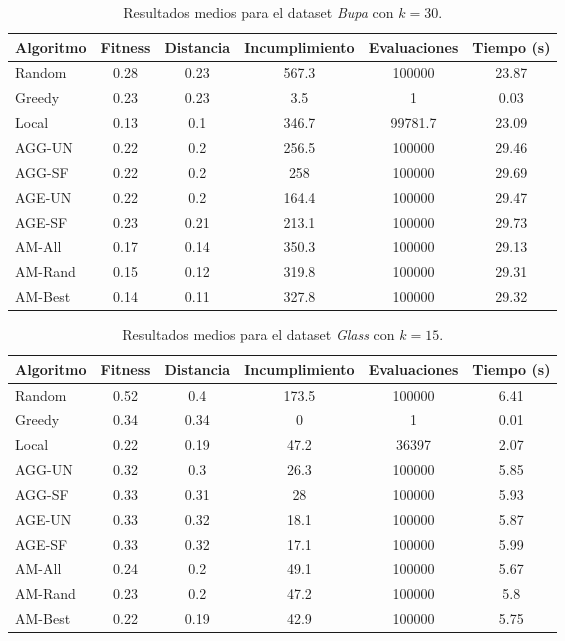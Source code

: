 \documentclass[a4paper,12pt]{article}%
\begin{document}
\begin{table}[H]
	\centering
	\begin{tabular}{|l|ccccc|}
		\hline
		Algoritmo & Fitness & Distancia & Incumplimiento & Evaluaciones & Tiempo (s) \\
		\hline
		Random & 0.28 & 0.23 & 567.3 & 100000 & 23.87 \\
		Greedy & 0.23 & 0.23 & 3.5 & 1 & 0.03 \\
		Local  & 0.13 & 0.1 & 346.7 & 99781.7 & 23.09 \\
		AGG-UN & 0.22 & 0.2 & 256.5 & 100000 & 29.46 \\
		AGG-SF & 0.22 & 0.2 & 258 & 100000 & 29.69 \\
		AGE-UN & 0.22 & 0.2 & 164.4 & 100000 & 29.47 \\
		AGE-SF & 0.23 & 0.21 & 213.1 & 100000 & 29.73 \\
		AM-All & 0.17 & 0.14 & 350.3 & 100000 & 29.13 \\
		AM-Rand & 0.15 & 0.12 & 319.8 & 100000 & 29.31 \\
		AM-Best & 0.14 & 0.11 & 327.8 & 100000 & 29.32 \\
		\hline
	\end{tabular}
	\caption{Resultados medios para el dataset \textit{Bupa} con $k=30$.}
	\label{tab_bupa30}
\end{table}

\begin{table}[H]
	\centering
	\begin{tabular}{|l|ccccc|}
		\hline
		Algoritmo & Fitness & Distancia & Incumplimiento & Evaluaciones & Tiempo (s) \\
		\hline
		Random & 0.52 & 0.4 & 173.5 & 100000 & 6.41 \\
		Greedy & 0.34 & 0.34 & 0 & 1 & 0.01 \\
		Local  & 0.22 & 0.19 & 47.2 & 36397 & 2.07 \\
		AGG-UN & 0.32 & 0.3 & 26.3 & 100000 & 5.85 \\
		AGG-SF & 0.33 & 0.31 & 28 & 100000 & 5.93 \\
		AGE-UN & 0.33 & 0.32 & 18.1 & 100000 & 5.87 \\
		AGE-SF & 0.33 & 0.32 & 17.1 & 100000 & 5.99 \\
		AM-All & 0.24 & 0.2 & 49.1 & 100000 & 5.67 \\
		AM-Rand & 0.23 & 0.2 & 47.2 & 100000 & 5.8 \\
		AM-Best & 0.22 & 0.19 & 42.9 & 100000 & 5.75 \\
		\hline
	\end{tabular}
	\caption{Resultados medios para el dataset \textit{Glass} con $k=15$.}
	\label{tab_glass15}
\end{table}
\end{document}
